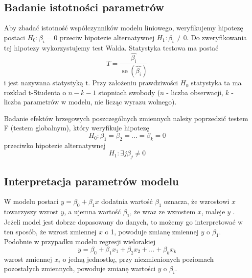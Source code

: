 \documentclass[12pt]{mwbk}
\theoremstyle{plain}
\theoremstyle{definition}
\theoremstyle{remark}
\begin{document}
\subsection{Badanie istotności parametrów}

Aby zbadać istotność współczynników modelu liniowego, weryfikujemy hipotezę postaci $H_0: \beta_i = 0$ przeciw hipotezie alternatywnej $H_1: \beta_i \neq 0.																																																																																																																																																																																																																																																																																																																																																																																																																																																																																																																													$ Do zweryfikowania tej hipotezy wykorzystujemy test Walda. Statystyka testowa ma postać $$T=\frac{\hat{\beta_i}}{\operatorname{se}(\hat{\beta_i})}$$ i jest nazywana statystyką t. Przy założeniu prawdziwości $H_0$ statystyka ta ma rozkład t-Studenta o $n-k-1$ stopniach swobody ($n$ - liczba obserwacji, $k$ - liczba parametrów w modelu, nie licząc wyrazu wolnego).

Badanie efektów brzegowych poszczególnych zmiennych należy poprzedzić testem F (testem globalnym), który weryfikuje hipotezę $$H_0: \beta_1=\beta_2=\ldots=\beta_k=0$$
 przeciwko hipotezie alternatywnej $$H_1: \exists{j} \beta_j \neq 0 $$

\subsection{Interpretacja parametrów modelu}

W modelu postaci $y=\beta_0 +\beta_1 x$ dodatnia wartość $\beta_1$ oznacza, że wzrostowi $x$ towarzyszy wzrost $y$, a ujemna wartość $\beta_1$, że wraz ze wzrostem $x$, maleje $y$ \cite{rozrzut}. Jeżeli model jest dobrze dopasowany do danych, to możemy go interpretować w ten sposób, że wzrost zmiennej $x$ o 1, powoduje zmianę zmiennej $y$ o $\beta_1$. Podobnie w przypadku modelu regresji wielorakiej
$$y=\beta_0+\beta_1 x_1+\beta_2 x_2 + \ldots + \beta_k x_k$$
wzrost zmiennej $x_i$ o jedną jednostkę, przy niezmienionych poziomach pozostałych zmiennych, powoduje zmianę wartości $y$ o $\beta_i$.
\end{document}
